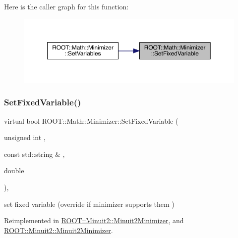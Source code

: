 Here is the caller graph for this function\+:\nopagebreak
\begin{figure}[H]
\begin{center}
\leavevmode
\includegraphics[width=350pt]{dc/dc4/classROOT_1_1Math_1_1Minimizer_a063e9d83c8a61afc8798ebb1d74b6f2b_icgraph}
\end{center}
\end{figure}
\mbox{\label{classROOT_1_1Math_1_1Minimizer_a063e9d83c8a61afc8798ebb1d74b6f2b}} 
\subsubsection{\texorpdfstring{SetFixedVariable()}{SetFixedVariable()}\hspace{0.1cm}{\footnotesize\ttfamily [2/2]}}
{\footnotesize\ttfamily virtual bool R\+O\+O\+T\+::\+Math\+::\+Minimizer\+::\+Set\+Fixed\+Variable (\begin{DoxyParamCaption}\item[{unsigned int}]{,  }\item[{const std\+::string \&}]{,  }\item[{double}]{ }\end{DoxyParamCaption})\hspace{0.3cm}{\ttfamily [inline]}, {\ttfamily [virtual]}}



set fixed variable (override if minimizer supports them ) 



Reimplemented in \mbox{\hyperlink{classROOT_1_1Minuit2_1_1Minuit2Minimizer_af42341b80ebb02d8c0882beaa781e7bd}{R\+O\+O\+T\+::\+Minuit2\+::\+Minuit2\+Minimizer}}, and \mbox{\hyperlink{classROOT_1_1Minuit2_1_1Minuit2Minimizer_af42341b80ebb02d8c0882beaa781e7bd}{R\+O\+O\+T\+::\+Minuit2\+::\+Minuit2\+Minimizer}}.

\mbox{\label{classROOT_1_1Math_1_1Minimizer_a4391c613ab0c3f9777e56b487ffa5eac}} 
